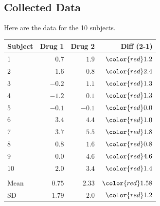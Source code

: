 \subsection{Collected Data}
Here are the data for the 10 subjects.
\begin{table}[!hbp]
 \begin{center}
 \begin{tabular}{lrrr}\hline\hline
Subject & Drug 1 & Drug 2 & {\color{red}Diff (2-1)}
\\ \hline
1 & $ 0.7$&$ 1.9$&$\color{red}1.2$\\
2 &$-1.6$&$ 0.8$&$\color{red}2.4$\\
3 &$-0.2$&$ 1.1$&$\color{red}1.3$\\
4 &$-1.2$&$ 0.1$&$\color{red}1.3$\\
5 &$-0.1$&$-0.1$&$\color{red}0.0$\\
6 &$ 3.4$&$ 4.4$&$\color{red}1.0$\\
7 &$ 3.7$&$ 5.5$&$\color{red}1.8$\\
8 &$ 0.8$&$ 1.6$&$\color{red}0.8$\\
9 &$ 0.0$&$ 4.6$&$\color{red}4.6$\\
10 &$ 2.0$&$ 3.4$&$\color{red}1.4$\\ \\
Mean & $ 0.75$&$ 2.33$&$\color{red}1.58$\\
SD & $ 1.79$&$ 2.0$&$\color{red}1.2$\\
\hline
\end{tabular}
\end{center}
\end{table}
